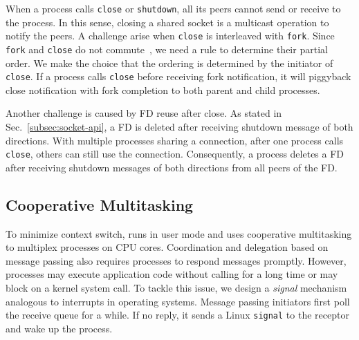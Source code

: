 
When a process calls \texttt{close} or \texttt{shutdown}, all its peers cannot send or receive to the process. In this sense, closing a shared socket is a multicast operation to notify the peers. A challenge arise when \texttt{close} is interleaved with \texttt{fork}. Since \texttt{fork} and \texttt{close} do not commute~\cite{clements2015scalable}, we need a rule to determine their partial order. We make the choice that the ordering is determined by the initiator of \texttt{close}. If a process calls \texttt{close} before receiving fork notification, it will piggyback close notification with fork completion to both parent and child processes.

Another challenge is caused by FD reuse after close. As stated in Sec.~\ref{subsec:socket-api}, a FD is deleted after receiving shutdown message of both directions. With multiple processes sharing a connection, after one process calls \texttt{close}, others can still use the connection. Consequently, a process deletes a FD after receiving shutdown messages of both directions from all peers of the FD.




\subsection{Cooperative Multitasking}
\label{subsec:process-mux}

To minimize context switch, \sys{} runs in user mode and uses cooperative multitasking to multiplex processes on CPU cores. Coordination and delegation based on message passing also requires processes to respond messages promptly. However, processes may execute application code without calling \libipc{} for a long time or may block on a kernel system call. To tackle this issue, we design a \textit{signal} mechanism analogous to interrupts in operating systems. Message passing initiators first poll the receive queue for a while. If no reply, it sends a Linux \texttt{signal} to the receptor and wake up the process.

